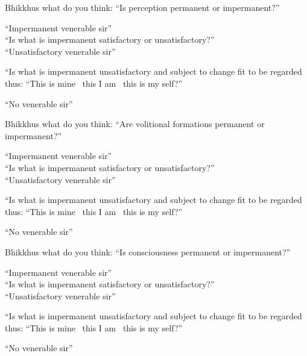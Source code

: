 \begin{english-only-no-hang}
  \begin{english-only-hang}
    Bhikkhus what do you think: ``Is perception permanent or impermanent?''
  \end{english-only-hang}
  ``Impermanent venerable sir''\\
  ``Is what is impermanent satisfactory or unsatisfactory?''\\
  ``Unsatisfactory venerable sir''\\
  \ifninebythirteenversion\clearpage\fi
  \begin{english-hang-together}
    ``Is what is impermanent unsatisfactory and subject to change fit to be regarded thus: ``This is mine \breathmark\ this I am \breathmark\ this is my self?''
  \end{english-hang-together}
  ``No venerable sir''
\end{english-only-no-hang}

\begin{english-only-no-hang}
  \begin{english-only-hang}
    Bhikkhus what do you think: ``Are volitional formations permanent or impermanent?''
  \end{english-only-hang}
  ``Impermanent venerable sir''\\
  ``Is what is impermanent satisfactory or unsatisfactory?''\\
  ``Unsatisfactory venerable sir''
  \begin{english-hang-together}
    ``Is what is impermanent unsatisfactory and subject to change fit to be regarded thus: ``This is mine \breathmark\ this I am \breathmark\ this is my self?''
  \end{english-hang-together}
  ``No venerable sir''
\end{english-only-no-hang}

\begin{english-only-no-hang}
  \begin{english-only-hang}
    Bhikkhus what do you think: ``Is consciousness permanent or impermanent?''
  \end{english-only-hang}
  ``Impermanent venerable sir''\\
  ``Is what is impermanent satisfactory or unsatisfactory?''\\
  ``Unsatisfactory venerable sir''\\
  \begin{english-hang-together}
    ``Is what is impermanent unsatisfactory and subject to change fit to be regarded thus: ``This is mine \breathmark\ this I am \breathmark\ this is my self?''
  \end{english-hang-together}
  ``No venerable sir''
\end{english-only-no-hang}

